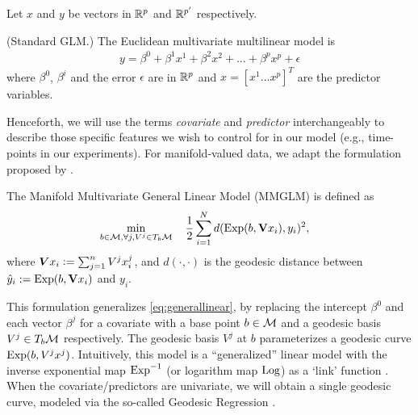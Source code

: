 Let $x$ and $y$ be vectors in $\mathbb{R}^p$ and $\mathbb{R}^{p'}$ respectively.
\begin{definition} (Standard GLM.) The Euclidean multivariate multilinear model is 
{\begin{equation}
	\begin{split}
	y  = \beta^0 + \beta^{1} x^{1} + \beta^{2} x^{2} + \ldots +\beta^{p} x^{p} + \epsilon
	\end{split}
	\label{eq:generallinear}
	\end{equation}}
where $\beta^0$, $\beta^{i}$ and the error $\epsilon$ are in $\mathbb{R}^{p}$ and $x = [x^1 \ldots x^p ]^{T}$ are the 
predictor variables.
\end{definition}
Henceforth, we will use the terms \textit{covariate} and \textit{predictor} interchangeably to describe those specific features we wish to control for in our model (e.g., time-points in our experiments).
For manifold-valued data, we adapt the formulation proposed by \cite{hjkimcvpr2014}.
\begin{definition} The Manifold Multivariate General Linear Model (MMGLM) is defined as 
{\begin{equation}
	\begin{split}
	&\min_{b \in \Mc, \forall j, V^j \in T_{b}\Mc} \quad \frac{1}{2} %
	\sum_{i=1}^{N}d(\EXP(b, \textbf{V} x_i),y_i)^2,
	\end{split}
	\label{eq:multigr}
	\end{equation}}
where $\bm{V} x_i \mathrel{\mathop:}= \sum_{j=1}^{n}V^j x_{i}^{j}$, and $d(\cdot, \cdot)$ is the geodesic distance between $\hat{y}_i:=\text{Exp}(b, \textbf{V} x_i)$ and $y_i$. 
\end{definition}
This formulation generalizes \eqref{eq:generallinear}, by replacing the intercept $\beta^0$ and each vector $\beta^j$ for a covariate with a 
base point $b \in \mathcal{M}$ and a geodesic basis $V^j \in T_{b}\mathcal{M}$ respectively. The geodesic basis $V^j$ at $b$ parameterizes a geodesic curve $\text{Exp}(b,V^jx^j)$.
Intuitively, this model is a ``generalized'' linear model with the inverse exponential map $\text{Exp}^{-1}$ (or logarithm map $\text{Log}$) as a 
`link' function \citep{hjkimcvpr2014,cornea2016regression}. When the covariate/predictors are univariate, we will obtain a single geodesic curve, modeled via 
the so-called Geodesic Regression \citep{fletcher2013geodesic,shi2009intrinsic,zhu2009intrinsic,yuan2012local}.

